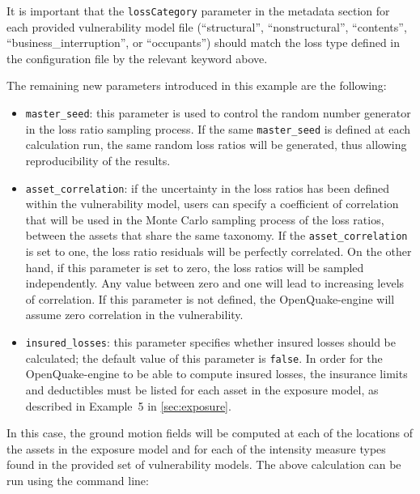 It is important that the \Verb+lossCategory+ parameter in the metadata section
for each provided vulnerability model file (``structural'', ``nonstructural'',
``contents'', ``business\_interruption'', or ``occupants'') should match the
loss type defined in the configuration file by the relevant keyword above.

The remaining new parameters introduced in this example are the following:

\begin{itemize}

  \item \Verb+master_seed+: this parameter is used to control the random
    number generator in the loss ratio sampling process. If the same
    \Verb+master_seed+ is defined at each calculation run, the same random loss
    ratios will be generated, thus allowing reproducibility of the results.

  \item \Verb+asset_correlation+: if the uncertainty in the loss ratios
    has been defined within the \gls{vulnerability model}, users can specify
    a coefficient of correlation that will be used in the Monte Carlo sampling
    process of the loss ratios, between the assets that share the same
    \gls{taxonomy}. If the \Verb+asset_correlation+ is set to one,
    the loss ratio residuals will be perfectly correlated. On the other hand,
    if this parameter is set to zero, the loss ratios will be sampled
    independently. Any value between zero and one will lead to increasing
    levels of correlation. If this parameter is not defined, the
    OpenQuake-engine will assume zero correlation in the vulnerability.

  \item \Verb+insured_losses+: this parameter specifies whether insured losses
    should be calculated; the default value of this parameter is \Verb+false+.
    In order for the OpenQuake-engine to be able to compute insured losses, the
    insurance limits and deductibles must be listed for each asset in the 
    exposure model, as described in Example~5 in \ref{sec:exposure}.

\end{itemize}

In this case, the ground motion fields will be computed at each of the
locations of the assets in the exposure model and for each of the intensity
measure types found in the provided set of vulnerability models. The above
calculation can be run using the command line:

